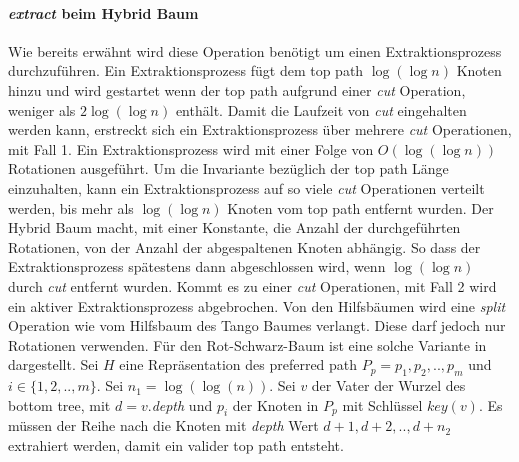 \documentclass[a4paper,12pt]{article}
\begin{document}
\paragraph{\textit{extract} beim Hybrid Baum} \label{hybridExtract}
Wie bereits erwähnt wird diese Operation benötigt um einen Extraktionsprozess durchzuführen. Ein Extraktionsprozess fügt dem top path $\log\left(\log n\right)$ Knoten hinzu und wird gestartet wenn der top path aufgrund einer \textit{cut} Operation, weniger als $2\log\left(\log n\right)$ enthält. Damit die Laufzeit von \textit{cut} eingehalten werden kann, erstreckt sich ein Extraktionsprozess über mehrere \textit{cut} Operationen, mit Fall 1. Ein Extraktionsprozess wird mit einer Folge von $O\left(\log\left(\log n\right)\right)$ Rotationen ausgeführt. Um die Invariante bezüglich der top path Länge einzuhalten, kann ein Extraktionsprozess auf so viele \textit{cut} Operationen verteilt werden, bis mehr als $\log\left(\log n\right)$ Knoten vom top path entfernt wurden. Der Hybrid Baum macht, mit einer Konstante,  die Anzahl der durchgeführten Rotationen, von der Anzahl der abgespaltenen Knoten abhängig. So dass der  Extraktionsprozess spätestens dann abgeschlossen wird, wenn $\log\left(\log n\right)$ durch \textit{cut} entfernt wurden. Kommt es zu einer \textit{cut} Operationen, mit Fall 2 wird ein aktiver Extraktionsprozess abgebrochen. 
Von den Hilfsbäumen wird eine \textit{split} Operation wie vom Hilfsbaum des Tango Baumes verlangt. Diese darf jedoch nur Rotationen verwenden. Für den Rot-Schwarz-Baum ist eine solche Variante in \cite{zipper} dargestellt. 
Sei $H$ eine Repräsentation des preferred path $P_p = p_1,p_2,..,p_m$ und $i \in \{1, 2,..,m\}$. Sei $n_1 = \log\left(\log\left(n\right)\right)$. Sei $v$ der Vater der Wurzel des bottom tree, mit $d = v.$\textit{depth} und $p_i$ der Knoten in $P_p$ mit Schlüssel $\mathit{key}\left(v\right)$. Es müssen der Reihe nach die Knoten mit \textit{depth} Wert $d+1, d+2,..,d + n_2$ extrahiert werden, damit ein valider top path entsteht. 
\end{document}
